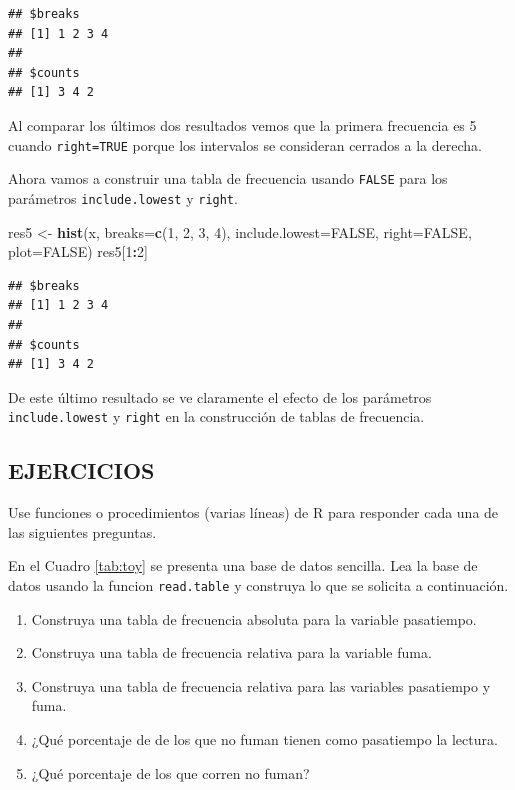 \documentclass[10pt,]{krantz}
\makeatletter
\newenvironment{Shaded}{\begin{snugshade}}{\end{snugshade}}
\newcommand{\KeywordTok}[1]{\textcolor[rgb]{0.13,0.29,0.53}{\textbf{#1}}}
\newcommand{\DataTypeTok}[1]{\textcolor[rgb]{0.13,0.29,0.53}{#1}}
\newcommand{\DecValTok}[1]{\textcolor[rgb]{0.00,0.00,0.81}{#1}}
\newcommand{\StringTok}[1]{\textcolor[rgb]{0.31,0.60,0.02}{#1}}
\newcommand{\OtherTok}[1]{\textcolor[rgb]{0.56,0.35,0.01}{#1}}
\newcommand{\OperatorTok}[1]{\textcolor[rgb]{0.81,0.36,0.00}{\textbf{#1}}}
\newcommand{\NormalTok}[1]{#1}
\providecommand{\tightlist}{%
  \setlength{\itemsep}{0pt}\setlength{\parskip}{0pt}}
\newenvironment{kframe}{%
\medskip{}
\setlength{\fboxsep}{.8em}
 \def\at@end@of@kframe{}%
 \ifinner\ifhmode%
  \def\at@end@of@kframe{\end{minipage}}%
  \begin{minipage}{\columnwidth}%
 \fi\fi%
 \def\FrameCommand##1{\hskip\@totalleftmargin \hskip-\fboxsep
 \colorbox{shadecolor}{##1}\hskip-\fboxsep
     \hskip-\linewidth \hskip-\@totalleftmargin \hskip\columnwidth}%
 \MakeFramed {\advance\hsize-\width
   \@totalleftmargin\z@ \linewidth\hsize
   \@setminipage}}%
 {\par\unskip\endMakeFramed%
 \at@end@of@kframe}
\renewenvironment{Shaded}{\begin{kframe}}{\end{kframe}}
\makeatother
\begin{document}
\begin{verbatim}
## $breaks
## [1] 1 2 3 4
## 
## $counts
## [1] 3 4 2
\end{verbatim}

Al comparar los últimos dos resultados vemos que la primera frecuencia
es 5 cuando \texttt{right=TRUE} porque los intervalos se consideran
cerrados a la derecha.

Ahora vamos a construir una tabla de frecuencia usando \texttt{FALSE}
para los parámetros \texttt{include.lowest} y \texttt{right}.

\begin{Shaded}
\begin{Highlighting}[]
\NormalTok{res5 <-}\StringTok{ }\KeywordTok{hist}\NormalTok{(x, }\DataTypeTok{breaks=}\KeywordTok{c}\NormalTok{(}\DecValTok{1}\NormalTok{, }\DecValTok{2}\NormalTok{, }\DecValTok{3}\NormalTok{, }\DecValTok{4}\NormalTok{),}
             \DataTypeTok{include.lowest=}\OtherTok{FALSE}\NormalTok{, }\DataTypeTok{right=}\OtherTok{FALSE}\NormalTok{,}
             \DataTypeTok{plot=}\OtherTok{FALSE}\NormalTok{)}
\NormalTok{res5[}\DecValTok{1}\OperatorTok{:}\DecValTok{2}\NormalTok{]}
\end{Highlighting}
\end{Shaded}

\begin{verbatim}
## $breaks
## [1] 1 2 3 4
## 
## $counts
## [1] 3 4 2
\end{verbatim}

De este último resultado se ve claramente el efecto de los parámetros
\texttt{include.lowest} y \texttt{right} en la construcción de tablas de
frecuencia.

\subsection*{EJERCICIOS}\label{ejercicios-3}

Use funciones o procedimientos (varias líneas) de R para responder cada
una de las siguientes preguntas.

En el Cuadro \ref{tab:toy} se presenta una base de datos sencilla. Lea
la base de datos usando la funcion \texttt{read.table} y construya lo
que se solicita a continuación.

\begin{enumerate}
\def\labelenumi{\arabic{enumi}.}
\tightlist
\item
  Construya una tabla de frecuencia absoluta para la variable
  pasatiempo.
\item
  Construya una tabla de frecuencia relativa para la variable fuma.
\item
  Construya una tabla de frecuencia relativa para las variables
  pasatiempo y fuma.
\item
  ¿Qué porcentaje de de los que no fuman tienen como pasatiempo la
  lectura.
\item
  ¿Qué porcentaje de los que corren no fuman?
\end{enumerate}
\end{document}
